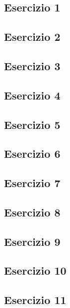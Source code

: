 \vspace{0.8cm}
\subsection{\textbf{Esercizio 1}}

\vspace{1cm}
\subsection{\textbf{Esercizio 2}}

\vspace{1cm}
\subsection{\textbf{Esercizio 3}}

\vspace{1cm}
\subsection{\textbf{Esercizio 4}}

\vspace{1cm}
\subsection{\textbf{Esercizio 5}}

\vspace{1cm}
\subsection{\textbf{Esercizio 6}}

\vspace{1cm}
\subsection{\textbf{Esercizio 7}}

\vspace{1cm}
\subsection{\textbf{Esercizio 8}}

\vspace{1cm}
\subsection{\textbf{Esercizio 9}}

\vspace{1cm}
\subsection{\textbf{Esercizio 10}}

\vspace{1cm}
\subsection{\textbf{Esercizio 11}}

